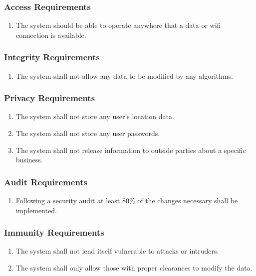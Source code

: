\documentclass[titlepage]{article}
\begin{document}
		\subsubsection{Access Requirements}
		\label{ssub:access_requirements}
		\begin{enumerate}[{SR}1. ]
			\item
			The system should be able to operate anywhere that a data or wifi connection is available.
		\end{enumerate}
		
		\subsubsection{Integrity Requirements}
		\label{ssub:integrity_requirements}
		\begin{enumerate}[{SR}1. ]
			\item 
			The system shall not allow any data to be modified by any algorithms.
		\end{enumerate}
		
		\subsubsection{Privacy Requirements}
		\label{ssub:privacy_requirements}
		\begin{enumerate}[{SR}1. ]
			\item 
			The system shall not store any user's location data.
			\item
			The system shall not store any user passwords.
			\item
			The system shall not release information to outside parties about a specific business.
		\end{enumerate}
		
		\subsubsection{Audit Requirements}
		\label{ssub:audit_requirements}
		\begin{enumerate}[{SR}1. ]
			\item 
			Following a security audit at least 80\% of the changes necessary shall be implemented.
		\end{enumerate}
		
		\subsubsection{Immunity Requirements}
		\label{ssub:immunity_requirements}
		\begin{enumerate}[{SR}1. ]
			\item 
			The system shall not lend itself vulnerable to attacks or intruders.
			\item
			The system shall only allow those with proper clearances to modify the data.
		\end{enumerate}
		
\end{document}
